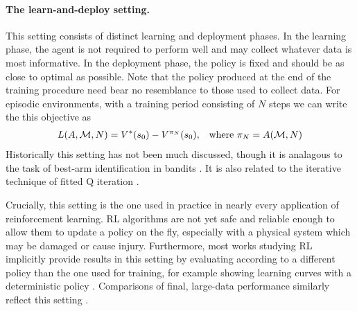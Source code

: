 \paragraph{The learn-and-deploy setting.}
This setting consists of distinct learning and deployment phases.
In the learning phase, the agent is not required to perform well and may collect whatever data is most informative.
In the deployment phase, the policy is fixed and should be as close to optimal as possible.
Note that the policy produced at the end of the training procedure need bear no resemblance to those used to collect data.
For episodic environments, with a training period consisting of $N$ steps we can write the this objective as
\begin{align}
    L(A, \mathcal{M}, N) = V^*(s_0) - V^{\pi_N}(s_0), && \text{where } \pi_N = A(\mathcal{M}, N)
\end{align}
Historically this setting has not been much discussed, though it is analagous to the task of best-arm identification in bandits \citep{Russo2016SimpleBA,Kaufmann2016OnTC}.
It is also related to the iterative technique of fitted Q iteration \citep{Ernst2005TreeBasedBM,Riedmiller2005NeuralFQ}.

Crucially, this setting is the one used in practice in nearly every application of reinforcement learning.
RL algorithms are not yet safe and reliable enough to allow them to update a policy on the fly, especially with a physical system which may be damaged or cause injury.
Furthermore, most works studying RL implicitly provide results in this setting by evaluating according to a different policy than the one used for training, for example showing learning curves with a deterministic policy \citep{Mnih2015HumanlevelCT,Lillicrap2016ContinuousCW,Fujimoto2018AddressingFA,haarnoja2018softA}.
Comparisons of final, large-data performance similarly reflect this setting \citep{Silver2016MasteringTG,Vinyals2019GrandmasterLI,openai2019dota,OpenAI2019SolvingRC}.


